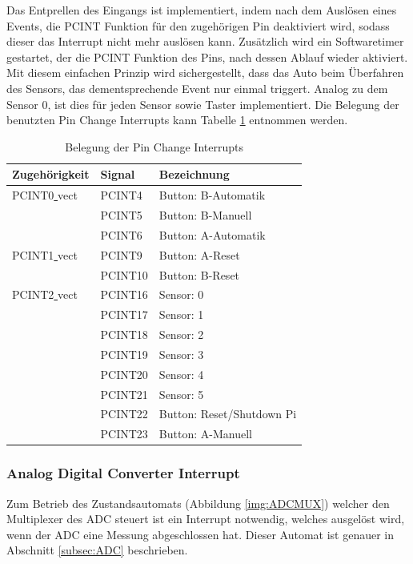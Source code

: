 \documentclass[a4paper, 11pt]{report}
\begin{document}
			Das Entprellen des Eingangs ist implementiert, indem nach dem Auslösen eines Events, die PCINT Funktion für den zugehörigen Pin deaktiviert wird, sodass dieser das Interrupt nicht mehr auslösen kann. Zusätzlich wird ein Softwaretimer gestartet, der die PCINT Funktion des Pins, nach dessen Ablauf wieder aktiviert. Mit diesem einfachen Prinzip wird sichergestellt, dass das Auto beim Überfahren des Sensors, das dementsprechende Event nur einmal triggert.
			Analog zu dem Sensor 0, ist dies für jeden Sensor sowie Taster implementiert. Die Belegung der benutzten Pin Change Interrupts kann Tabelle \ref{tab:belegungpcint} entnommen werden.
			\begin{table}[ht]
				\caption{Belegung der Pin Change Interrupts}
				\begin{tabular}{|l|l|l|}
					\hline
					Zugehörigkeit & Signal & Bezeichnung\\
					\hline
					\hline
					PCINT0\underline{ }vect & PCINT4 & Button: B-Automatik\\
					\hline
											& PCINT5 & Button: B-Manuell\\
					\hline
											& PCINT6 & Button: A-Automatik\\
					\hline
					\hline
					PCINT1\underline{ }vect & PCINT9 & Button: A-Reset\\
					\hline
											& PCINT10 & Button: B-Reset\\
					\hline
					\hline
					PCINT2\underline{ }vect & PCINT16 & Sensor: 0\\
					\hline
											& PCINT17 & Sensor: 1\\
					\hline
											& PCINT18 & Sensor: 2\\
					\hline
											& PCINT19 & Sensor: 3\\
					\hline
											& PCINT20 & Sensor: 4\\
					\hline
											& PCINT21 & Sensor: 5\\
					\hline
											& PCINT22 & Button: Reset/Shutdown Pi\\
					\hline
											& PCINT23 & Button: A-Manuell\\
					\hline
				\end{tabular}

				\label{tab:belegungpcint}
			\end{table}
			\subsubsection{Analog Digital Converter Interrupt}\label{subsubsec:ADCINT}
			Zum Betrieb des Zustandsautomats (Abbildung \ref{img:ADCMUX}) welcher den Multiplexer des ADC steuert ist ein Interrupt notwendig, welches ausgelöst wird, wenn der ADC eine Messung abgeschlossen hat. Dieser Automat ist genauer in Abschnitt \ref{subsec:ADC} beschrieben.
\end{document}
